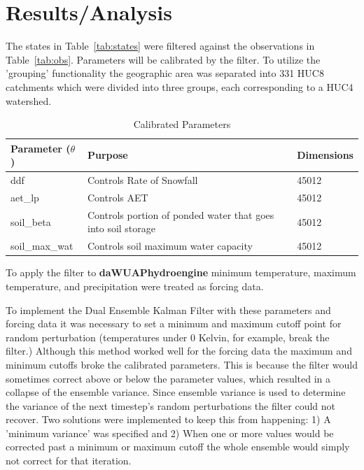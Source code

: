 \chapter{Results/Analysis}

The states in Table~\ref{tab:states} were filtered against the observations in Table~\ref{tab:obs}. Parameters will be calibrated by the filter. To utilize the 'grouping' functionality the geographic area was separated into  331 HUC8 catchments which were divided into three groups, each corresponding to a HUC4 watershed.

\begin{table}[]
\caption{Calibrated Parameters} 
\begin{tabular}{lll}
Parameter ($\theta$) & Purpose                                                    & Dimensions  \\ \hline
ddf                  & Controls Rate of Snowfall                                        & 45012 \\
aet\_lp              & Controls AET                                                      & 45012 \\
soil\_beta           & Controls portion of ponded water that goes into soil storage & 45012 \\
soil\_max\_wat       & Controls soil maximum water capacity & 45012
\end{tabular}
\label{tab:t_params}
\end{table}

To apply the filter to \textbf{daWUAPhydroengine} minimum temperature, maximum temperature, and precipitation were treated as forcing data.

To implement the Dual Ensemble Kalman Filter with these parameters and forcing data it was necessary to set a minimum and maximum cutoff point for random perturbation (temperatures under 0 Kelvin, for example, break the filter.) Although this method worked well  for the forcing data the maximum and minimum cutoffs broke the calibrated parameters. This is because the filter would sometimes correct above or below the parameter values, which resulted in a collapse of the ensemble variance. Since ensemble variance is used to determine the variance of the next timestep's random perturbations the filter could not recover. Two solutions were implemented to keep this from happening: 1) A 'minimum variance' was specified and 2) When one or more values would be corrected past a minimum or maximum cutoff the whole ensemble would simply not correct for that iteration.

